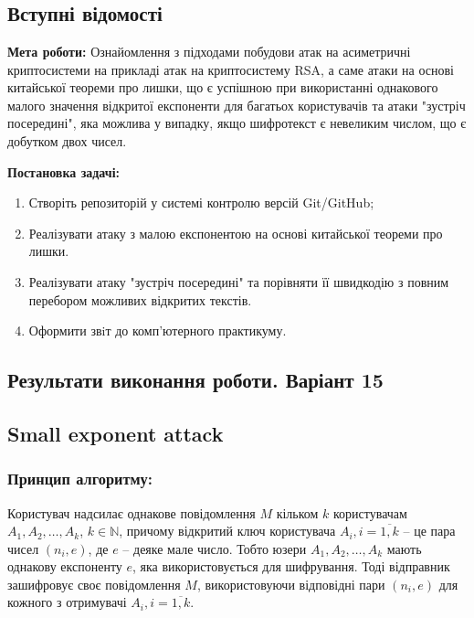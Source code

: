 \setcounter{chapter}{2}
\chapter{}
\section{Вступні відомості}
\noindent\textbf{Мета роботи:} Ознайомлення з підходами побудови атак на асиметричні криптосистеми на прикладі атак на криптосистему 
RSA, а саме атаки на основі китайської теореми про лишки, що є успішною при використанні однакового малого значення відкритої експоненти 
для багатьох користувачів та атаки "зустріч посередині"{}, яка можлива у випадку, якщо шифротекст є невеликим числом, що є добутком двох чисел.

\noindent\textbf{Постановка задачі:}
\begin{enumerate}
    \item Створіть репозиторій у системі контролю версій Git/GitHub;
    \item Реалізувати атаку з малою експонентою на основі китайської теореми про лишки.
    \item Реалізувати атаку "зустріч посередині"{} та порівняти її швидкодію з повним перебором можливих відкритих текстів.
    \item Оформити звiт до комп’ютерного практикуму.
\end{enumerate}
\section*{Результати виконання роботи. Варіант 15}

\section{Small exponent attack}
\subsection{Принцип алгоритму:}
Користувач надсилає однакове повідомлення $M$ кільком $k$ користувачам $A_{1}, A_{2}, \dots, A_{k}$, $k \in \mathbb{N}$, 
причому відкритий ключ користувача $A_{i}, i = \overline{1, k}$ -- це пара чисел $(n_{i}, e)$, де $e$ -- деяке мале число. 
Тобто юзери $A_{1}, A_{2}, \dots, A_{k}$ мають однакову експоненту $e$, яка використовується для шифрування. Тоді 
відправник зашифровує своє повідомлення $M$, використовуючи відповідні пари $(n_{i}, e)$ для кожного з отримувачі $A_{i}, i = \overline{1, k}$. 


